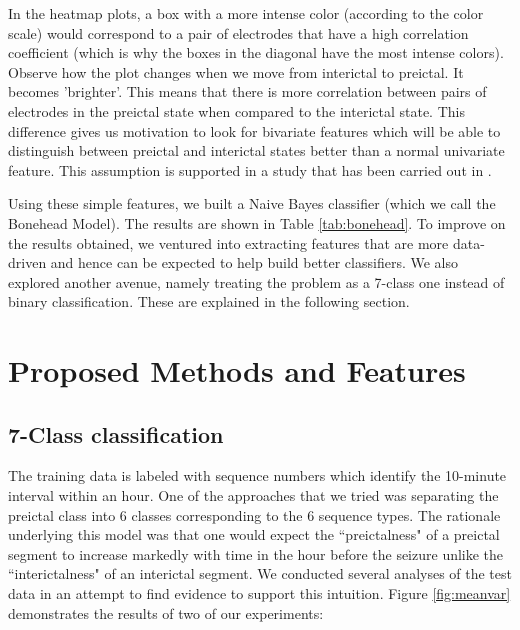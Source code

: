 \documentclass[a4paper]{article}
\begin{document}
In the heatmap plots, a box with a more intense color (according to the color scale) would correspond to a pair of electrodes that have a high correlation coefficient (which is why the boxes in the diagonal have the most intense colors). Observe how the plot changes when we move from interictal to preictal. It becomes 'brighter'.  This means that there is more correlation between pairs of electrodes in the preictal state when compared to the interictal state. This difference gives us motivation to look for bivariate features which will be able to distinguish between preictal and interictal states better than a normal univariate feature. This assumption is supported in a study that has been carried out in \cite{lecun}.

Using these simple features, we built a Naive Bayes classifier (which we call the Bonehead Model). The results are shown in Table \ref{tab:bonehead}. To improve on the results obtained, we ventured into extracting features that are more data-driven and hence can be expected to help build better classifiers. We also explored another avenue, namely treating the problem as a 7-class one instead of binary classification. These are explained in the following section.

\section{Proposed Methods and Features}

\subsection{7-Class classification}
The training data is labeled with sequence numbers which identify the 10-minute interval within an hour. One of the approaches that we tried was separating the preictal class into 6 classes corresponding to the 6 sequence types. The rationale underlying this model was that one would expect the ``preictalness" of a preictal segment to increase markedly with time in the hour before the seizure unlike the ``interictalness" of an interictal segment. We conducted several analyses of the test data in an attempt to find evidence to support this intuition. Figure \ref{fig:meanvar} demonstrates the results of two of our experiments:
\end{document}
